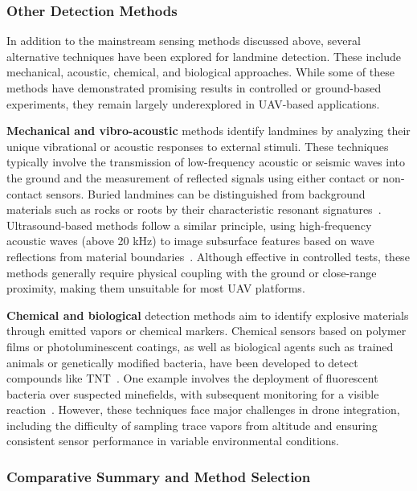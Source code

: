 \subsubsection{Other Detection Methods}

In addition to the mainstream sensing methods discussed above, several alternative techniques have been explored for landmine detection. These include mechanical, acoustic, chemical, and biological approaches. While some of these methods have demonstrated promising results in controlled or ground-based experiments, they remain largely underexplored in UAV-based applications.

\textbf{Mechanical and vibro-acoustic} methods identify landmines by analyzing their unique vibrational or acoustic responses to external stimuli. These techniques typically involve the transmission of low-frequency acoustic or seismic waves into the ground and the measurement of reflected signals using either contact or non-contact sensors. Buried landmines can be distinguished from background materials such as rocks or roots by their characteristic resonant signatures~\cite{Gooneratne2004ARO,gichd2006guidebook}. Ultrasound-based methods follow a similar principle, using high-frequency acoustic waves (above 20 kHz) to image subsurface features based on wave reflections from material boundaries~\cite{paik2002image,cardonalandmine}. Although effective in controlled tests, these methods generally require physical coupling with the ground or close-range proximity, making them unsuitable for most UAV platforms.

\textbf{Chemical and biological} detection methods aim to identify explosive materials through emitted vapors or chemical markers. Chemical sensors based on polymer films or photoluminescent coatings, as well as biological agents such as trained animals or genetically modified bacteria, have been developed to detect compounds like TNT~\cite{Gooneratne2004ARO,alqudsi2021review}. One example involves the deployment of fluorescent bacteria over suspected minefields, with subsequent monitoring for a visible reaction~\cite{cardonalandmine}. However, these techniques face major challenges in drone integration, including the difficulty of sampling trace vapors from altitude and ensuring consistent sensor performance in variable environmental conditions.



\subsubsection{Comparative Summary and Method Selection}

